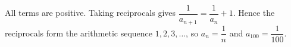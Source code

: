 All terms are positive. Taking reciprocals gives $\dfrac{1}{a_{n+1}}=\dfrac{1}{a_n}+1$. Hence the reciprocals form the arithmetic sequence $1,2,3,\ldots$, so $a_n=\dfrac{1}{n}$ and $\boxed{a_{100}=\dfrac{1}{100}}$.
